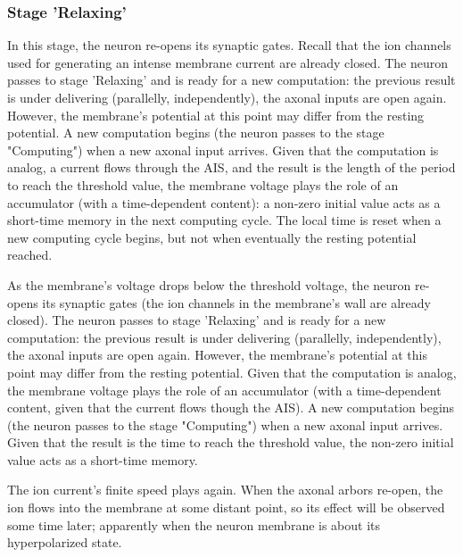 \subsubsection[Relaxing]{Stage 'Relaxing'\label{sec:Single-OperationRelaxing}}

\fi

\ifx\magyar\undefined


In this stage,
the neuron re-opens its synaptic gates. Recall that the ion channels
used for generating an intense membrane current
are already closed. The neuron passes to stage 'Relaxing' and is ready for a new computation:
the previous result is under delivering (parallelly, independently),
the axonal inputs are open again. 
However, the membrane's potential at this point may differ from the
resting potential.  A new computation begins
(the neuron passes to the stage "Computing")
when a new axonal input arrives.  Given that the computation is analog, a current flows through the AIS, and the result is the length of the period to reach
the threshold value, the 
membrane voltage plays the role of an accumulator (with a time-dependent content): a non-zero initial value acts as a short-time memory in the next computing cycle.
The local time is reset when a new computing cycle begins, but not when eventually the resting potential reached.

As the membrane's voltage drops below the threshold voltage,
the neuron re-opens its synaptic gates (the ion channels in the membrane's wall
are already closed). The neuron passes to stage 'Relaxing' and is ready for a new computation:
the previous result is under delivering (parallelly, independently),
the axonal inputs are open again. 
However, the membrane's potential at this point may differ from the
resting potential. Given that the computation is analog, the 
membrane voltage plays the role of an accumulator (with a time-dependent content,
given that the current flows though the AIS). A new computation begins
(the neuron passes to the stage "Computing")
when a new axonal input arrives. Given that the result is the time to reach
the threshold value, the non-zero initial value acts as a short-time memory.



The ion current's finite speed plays again. When the axonal arbors re-open,
the ion flows into the membrane at some distant point, so its effect
will be observed some time later; apparently when the neuron membrane is
about its hyperpolarized state. 
\else



